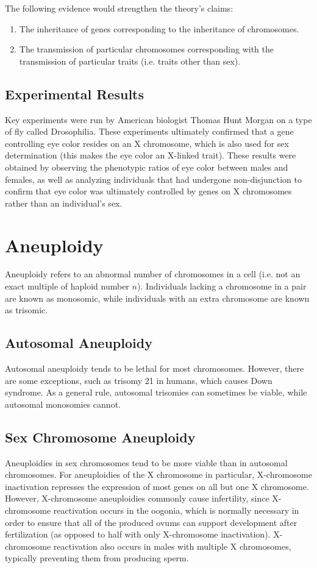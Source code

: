 \documentclass[12pt,titlepage]{article}
\begin{document}
      The following evidence would strengthen the theory's claims:
      \begin{enumerate}
        \item The inheritance of genes corresponding to the inheritance of chromosomes.
        \item The transmission of particular chromosomes corresponding with the transmission of particular traits (i.e. traits other than sex).
      \end{enumerate}

      \subsection{Experimental Results}
        Key experiments were run by American biologist Thomas Hunt Morgan on a type of fly called Drosophilia. These experiments ultimately
        confirmed that a gene controlling eye color resides on an X chromosome, which is also used for sex determination (this makes the eye
        color an X-linked trait). These results were obtained by observing the phenotypic ratios of eye color between males and females, as
        well as analyzing individuals that had undergone non-disjunction to confirm that eye color was ultimately controlled by genes on X
        chromosomes rather than an individual's sex.

  \newpage

  \section{Aneuploidy}
    Aneuploidy refers to an abnormal number of chromosomes in a cell (i.e. not an exact multiple of haploid number $n$). Individuals lacking a
    chromosome in a pair are known as monosomic, while individuals with an extra chromosome are known as trisomic.

    \subsection{Autosomal Aneuploidy}
      Autosomal aneuploidy tends to be lethal for most chromosomes. However, there are some exceptions, such as trisomy 21 in humans, which
      causes Down syndrome. As a general rule, autosomal trisomies can sometimes be viable, while autosomal monosomies cannot.

    \subsection{Sex Chromosome Aneuploidy}
      Aneuploidies in sex chromosomes tend to be more viable than in autosomal chromosomes. For aneuploidies of the X chromosome in particular,
      X-chromosome inactivation represses the expression of most genes on all but one X chromosome. However, X-chromosome aneuploidies commonly
      cause infertility, since X-chromosome reactivation occurs in the oogonia, which is normally necessary in order to ensure that all of
      the produced ovums can support development after fertilization (as opposed to half with only X-chromosome inactivation). X-chromosome
      reactivation also occurs in males with multiple X chromosomes, typically preventing them from producing sperm.
\end{document}
